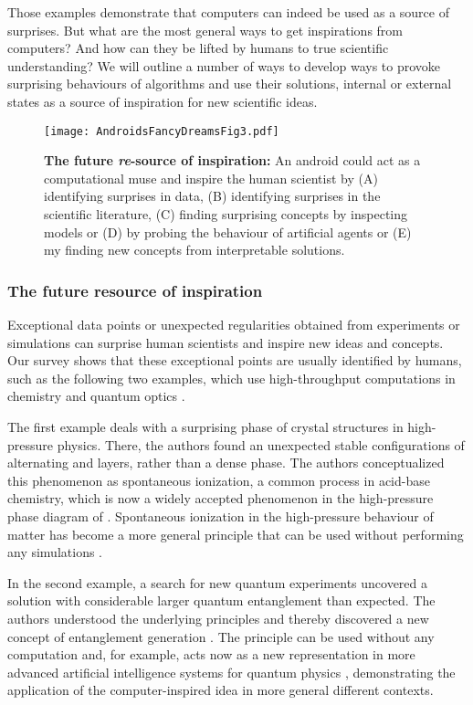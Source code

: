Those examples demonstrate that computers can indeed be used as a source of surprises. But what are the most general ways to get inspirations from computers? And how can they be lifted by humans to true scientific understanding? We will outline a number of ways to develop ways to provoke surprising behaviours of algorithms and use their solutions, internal or external states as a source of inspiration for new scientific ideas.

\begin{figure*}[ht]
\centering
\texttt{[image: AndroidsFancyDreamsFig3.pdf]}
\caption{\textbf{The future \textit{re}-source of inspiration: } An android could act as a computational muse and inspire the human scientist by (A) identifying surprises in data, (B) identifying surprises in the scientific literature, (C) finding surprising concepts by inspecting models or (D) by probing the behaviour of artificial agents or (E) my finding new concepts from interpretable solutions.}
\label{fig:flowofargument3}
\end{figure*}


\subsubsection*{The future resource of inspiration}
 Exceptional data points or unexpected regularities obtained from experiments or simulations can surprise human scientists and inspire new ideas and concepts. Our survey shows that these exceptional points are usually identified by humans, such as the following two examples, which use high-throughput computations in chemistry \cite{pickard2011ab} and quantum optics \cite{krenn2016automated,krenn2020computer}.

The first example deals with a surprising phase of crystal structures in high-pressure physics. There, the authors found an unexpected stable configurations of alternating  and  layers, rather than a dense  phase. The authors conceptualized this phenomenon as spontaneous ionization, a common process in acid-base chemistry, which is now a widely accepted phenomenon in the high-pressure phase diagram of . Spontaneous ionization in the high-pressure behaviour of matter has become a more general principle that can be used without performing any simulations \cite{pickard2008highly}.

In the second example, a search for new quantum experiments uncovered a solution with considerable larger quantum entanglement than expected. The authors understood the underlying principles and thereby discovered a new concept of entanglement generation \cite{krenn2017entanglement, krenn2017quantum}. The principle can be used without any computation and, for example, acts now as a new representation in more advanced artificial intelligence systems for quantum physics \cite{krenn2020conceptual}, demonstrating the application of the computer-inspired idea in more general different contexts.

